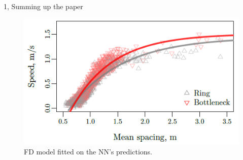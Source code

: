 \documentclass[10pt,a4paper]{article}
\begin{document}
\begin{task}{1, Summing up the paper}
\begin{figure}[H]
    \centering
    \includegraphics[scale=0.9]{images/speed_vs_mean_spacing_NN.png}
    \caption{FD model fitted on the NN's predictions.}
    \label{fig:fd-curves-fitted-nn-preds}
\end{figure}
\end{task}
\end{document}
